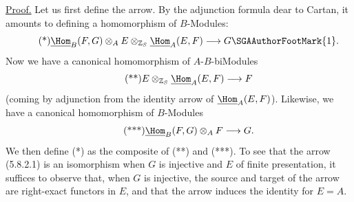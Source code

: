 \uline{Proof.} Let us first define the arrow. By the adjunction formula dear to Cartan, it amounts to defining a homomorphism of \(B\)-Modules:
\begin{equation}\tag{*}
  \underline{\Hom}_B(F,G)\otimes_A E\otimes_{\mathbb Z_S}\underline{\Hom}_A(E,F)
  \longrightarrow G\text{\SGAAuthorFootMark{1}}.
\end{equation}
Now we have a canonical homomorphism of \(A\)-\(B\)-biModules
\begin{equation}\tag{**}
  E\otimes_{\mathbb Z_S}\underline{\Hom}_A(E,F)
  \longrightarrow F
\end{equation}
(coming by adjunction from the identity arrow of \(\underline{\Hom}_A(E,F)\)). Likewise, we have a canonical homomorphism of \(B\)-Modules
\begin{equation}\tag{***}
  \underline{\Hom}_B(F,G)\otimes_A F\longrightarrow G.
\end{equation}
We then define (*) as the composite of (**) and (***). To see that the arrow (5.8.2.1) is an isomorphism when \(G\) is injective and \(E\) of finite presentation, it suffices to observe that, when \(G\) is injective, the source and target of the arrow are right-exact functors in \(E\), and that the arrow induces the identity for \(E=A\).


